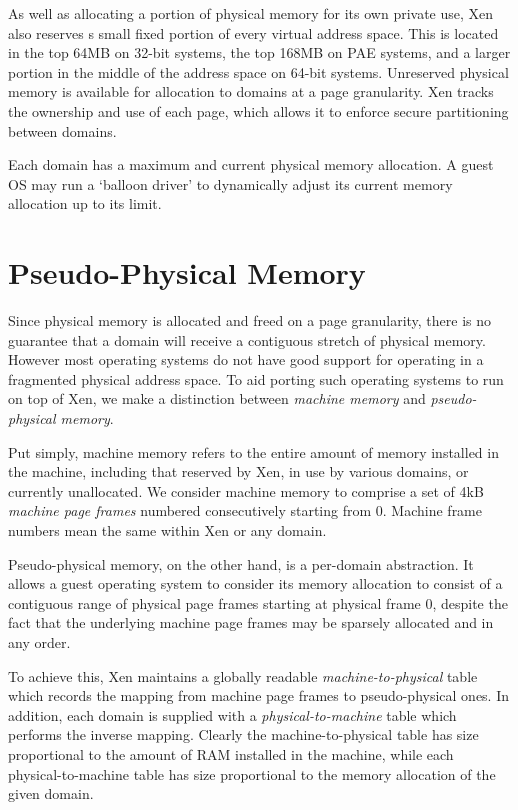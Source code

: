 \documentclass[11pt,twoside,final,openright]{report}
\begin{document}
As well as allocating a portion of physical memory for its own private
use, Xen also reserves s small fixed portion of every virtual address
space. This is located in the top 64MB on 32-bit systems, the top
168MB on PAE systems, and a larger portion in the middle of the
address space on 64-bit systems. Unreserved physical memory is
available for allocation to domains at a page granularity.  Xen tracks
the ownership and use of each page, which allows it to enforce secure
partitioning between domains.

Each domain has a maximum and current physical memory allocation.  A
guest OS may run a `balloon driver' to dynamically adjust its current
memory allocation up to its limit.


\section{Pseudo-Physical Memory}

Since physical memory is allocated and freed on a page granularity,
there is no guarantee that a domain will receive a contiguous stretch
of physical memory. However most operating systems do not have good
support for operating in a fragmented physical address space. To aid
porting such operating systems to run on top of Xen, we make a
distinction between \emph{machine memory} and \emph{pseudo-physical
  memory}.

Put simply, machine memory refers to the entire amount of memory
installed in the machine, including that reserved by Xen, in use by
various domains, or currently unallocated. We consider machine memory
to comprise a set of 4kB \emph{machine page frames} numbered
consecutively starting from 0. Machine frame numbers mean the same
within Xen or any domain.

Pseudo-physical memory, on the other hand, is a per-domain
abstraction. It allows a guest operating system to consider its memory
allocation to consist of a contiguous range of physical page frames
starting at physical frame 0, despite the fact that the underlying
machine page frames may be sparsely allocated and in any order.

To achieve this, Xen maintains a globally readable {\it
  machine-to-physical} table which records the mapping from machine
page frames to pseudo-physical ones. In addition, each domain is
supplied with a {\it physical-to-machine} table which performs the
inverse mapping. Clearly the machine-to-physical table has size
proportional to the amount of RAM installed in the machine, while each
physical-to-machine table has size proportional to the memory
allocation of the given domain.
\end{document}
